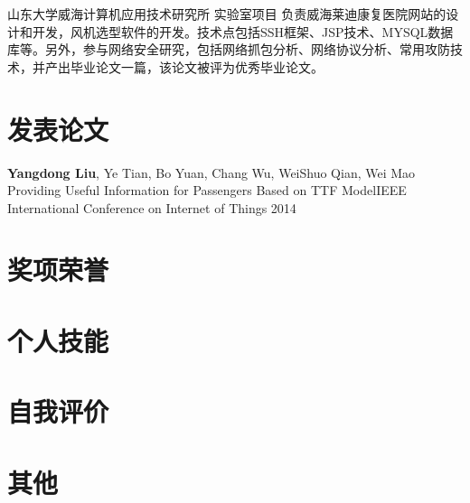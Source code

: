 \documentclass[11pt,a4paper]{moderncv}
\begin{document}
\vspace*{0.2\baselineskip}
{山东大学威海计算机应用技术研究所}
{}
{实验室项目}{}
{负责威海莱迪康复医院网站的设计和开发，风机选型软件的开发。技术点包括SSH框架、JSP技术、MYSQL数据库等。另外，参与网络安全研究，包括网络抓包分析、网络协议分析、常用攻防技术，并产出毕业论文一篇，该论文被评为优秀毕业论文。}


\renewcommand{\baselinestretch}{1.0}

\section{发表论文}
{\textbf{Yangdong Liu}\textnormal{, Ye Tian, Bo Yuan, Chang Wu, WeiShuo Qian, Wei Mao}}
{Providing Useful Information for Passengers Based on TTF Model}{IEEE International Conference on Internet of Things 2014}
{}{}{}


\section{奖项荣誉}


\section{个人技能}


\section{自我评价}

\section{其他}



\closesection{}                   %
\renewcommand{\listitemsymbol}{-} %
\end{document}
